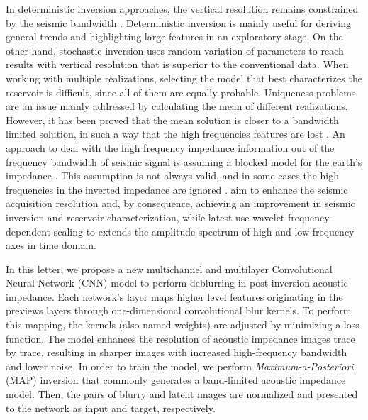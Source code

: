 \documentclass[journal]{IEEEtran}
\begin{document}
In deterministic inversion approaches, the vertical resolution
remains constrained by the seismic bandwidth \cite{Sancevero2005}.
Deterministic inversion is mainly useful for deriving general
trends and highlighting large features in an exploratory stage.
On the other hand, stochastic inversion uses random variation
of parameters to reach results with vertical resolution that is
superior to the conventional data. When working with multiple
realizations, selecting the model that best characterizes the
reservoir is difficult, since all of them are equally probable.
Uniqueness problems are an issue mainly addressed by calculating
the mean of different realizations. However, it has been proved
that the mean solution is closer to a bandwidth limited solution,
in such a way that the high frequencies features are lost
\cite{Cook2010}. An approach to deal with the high frequency
impedance information out of the frequency bandwidth of seismic signal
is assuming a blocked model for the earth's impedance \cite{Cook2010}.
This assumption is not always valid, and in some cases the high
frequencies in the inverted impedance are ignored \cite{YuanWang2015}.
\cite{xiaoiu} aim to enhance the seismic acquisition resolution and, by
consequence, achieving an improvement in seismic inversion and
reservoir characterization, while \cite{ChenWang2018} latest use wavelet
frequency-dependent scaling to extends the amplitude spectrum of
high and low-frequency axes in time domain. 

In this letter, we propose a new multichannel and multilayer
Convolutional Neural Network (CNN) model to perform deblurring
in post-inversion acoustic impedance. Each network's layer maps
higher level features originating in the previews layers through
one-dimensional convolutional blur kernels. To perform this
mapping, the kernels (also named weights) are adjusted by
minimizing a loss function. The model enhances the resolution
of acoustic impedance images trace by trace, resulting in sharper
images with increased high-frequency bandwidth and lower noise.
In order to train the model, we perform \textit{Maximum-a-Posteriori} (MAP)
inversion that commonly generates a band-limited acoustic impedance model.
Then, the pairs of blurry and latent images are normalized and 
presented to the network as input and target, respectively.
\end{document}
